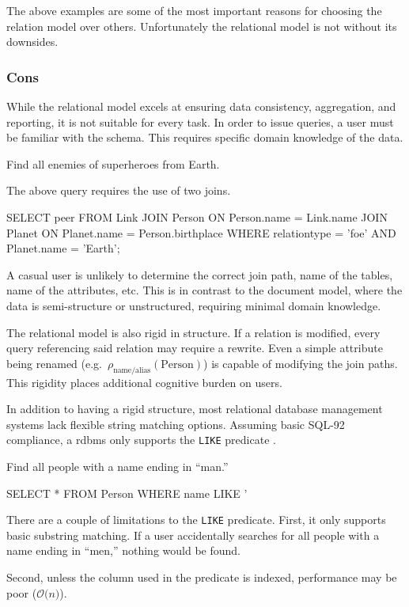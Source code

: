 			The above examples are some of the most important reasons for choosing the relation model over others.	Unfortunately the relational model is not without its downsides.
		
		\subsubsection{Cons}
			While the relational model excels at ensuring data consistency, aggregation, and reporting, it is not suitable for every task.	In order to issue queries, a user must be familiar with the schema.	 This requires specific domain knowledge of the data.
			
			\begin{ex}
				Find all enemies of superheroes from Earth.
				
				The above query requires the use of two joins.
				
				\begin{singlespaced}
					\begin{sqlcode}
SELECT peer
FROM   Link
	   JOIN Person
		 ON Person.name = Link.name
	   JOIN Planet
		 ON Planet.name = Person.birthplace
WHERE  relationtype = 'foe'
	   AND Planet.name = 'Earth';
					\end{sqlcode}
				\end{singlespaced}
			\end{ex}
			
			A casual user is unlikely to determine the correct join path, name of the tables, name of the attributes, etc.	This is in contrast to the document model, where the data is semi-structure or unstructured, requiring minimal domain knowledge.

			The relational model is also rigid in structure.  If a relation is modified, every query referencing said relation may require a rewrite.  Even a simple attribute being renamed (e.g.~$\rho_{\mathrm{name/alias}}(\mathrm{Person})$) is capable of modifying the join paths.  This rigidity places additional cognitive burden on users.
			
			In addition to having a rigid structure, most relational database management systems lack flexible string matching options.	 Assuming basic SQL-92 compliance, a \gls{rdbms} only supports the \texttt{LIKE} predicate \cite{sql-2011}.
			
			\begin{ex}
				Find all people with a name ending in ``man.''
				
				\begin{singlespaced}
					\begin{sqlcode}
SELECT *
FROM   Person
WHERE  name LIKE '%
					\end{sqlcode}
				\end{singlespaced}
			\end{ex}
			
			There are a couple of limitations to the \texttt{LIKE} predicate.  First, it only supports basic substring matching.  If a user accidentally searches for all people with a name ending in ``men,'' nothing would be found.
			
			Second, unless the column used in the predicate is indexed, performance may be poor ($\mathcal{O}\bigl(n\bigr)$).